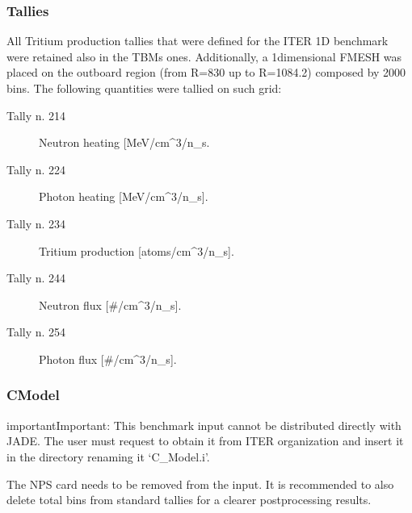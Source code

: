 \documentclass[letterpaper,10pt,english]{sphinxmanual}
\begin{document}
\subsubsection{Tallies}
\label{\detokenize{usage/benchmarks:id4}}
All Tritium production tallies that were defined for the ITER 1D benchmark
were retained also in the TBMs ones.
Additionally, a 1\sphinxhyphen{}dimensional FMESH was placed on the outboard region
(from R=830 up to R=1084.2) composed by 2000 bins. The following quantities
were tallied on such grid:
\begin{description}
\item[{Tally n. 214}] \leavevmode
Neutron heating {[}MeV/cm\textasciicircum{}3/n\_s.

\item[{Tally n. 224}] \leavevmode
Photon heating {[}MeV/cm\textasciicircum{}3/n\_s{]}.

\item[{Tally n. 234}] \leavevmode
Tritium production {[}atoms/cm\textasciicircum{}3/n\_s{]}.

\item[{Tally n. 244}] \leavevmode
Neutron flux {[}\#/cm\textasciicircum{}3/n\_s{]}.

\item[{Tally n. 254}] \leavevmode
Photon flux {[}\#/cm\textasciicircum{}3/n\_s{]}.

\end{description}




{\hyperref[\detokenize{usage/benchmarks:iter1ddesc}]{}}




\subsubsection{C\sphinxhyphen{}Model}
\label{\detokenize{usage/benchmarks:c-model}}
\begin{sphinxadmonition}{important}{Important:}
This benchmark input cannot be distributed directly with JADE. The user must request to obtain it
from ITER organization and insert it in the  directory renaming it
‘C\_Model.i’.

The NPS card needs to be removed from the input. It is recommended to also delete total bins
from standard tallies for a clearer post\sphinxhyphen{}processing results.
\end{sphinxadmonition}
\end{document}
